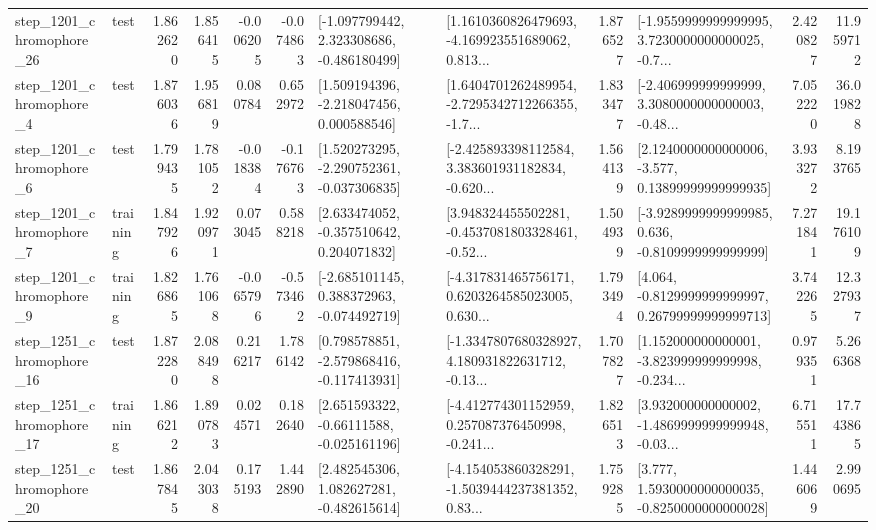 \begin{tabular}{llrrrrllrlrr}
 step\_1201\_chromophore\_26 &      test &      1.862620 &    1.856415 &     -0.006205 & -0.074863 &   [-1.097799442, 2.323308686, -0.486180499] &  [1.1610360826479693, -4.169923551689062, 0.813... &       1.876527 &  [-1.9559999999999995, 3.7230000000000025, -0.7... &            2.420827 &         11.959712 \\
  step\_1201\_chromophore\_4 &      test &      1.876036 &    1.956819 &      0.080784 &  0.652972 &    [1.509194396, -2.218047456, 0.000588546] &  [1.6404701262489954, -2.7295342712266355, -1.7... &       1.833477 &  [-2.406999999999999, 3.3080000000000003, -0.48... &            7.052220 &         36.019828 \\
  step\_1201\_chromophore\_6 &      test &      1.799435 &    1.781052 &     -0.018384 & -0.176763 &   [1.520273295, -2.290752361, -0.037306835] &  [-2.425893398112584, 3.383601931182834, -0.620... &       1.564139 &  [2.1240000000000006, -3.577, 0.13899999999999935] &            3.933272 &          8.193765 \\
  step\_1201\_chromophore\_7 &  training &      1.847926 &    1.920971 &      0.073045 &  0.588218 &    [2.633474052, -0.357510642, 0.204071832] &  [3.948324455502281, -0.4537081803328461, -0.52... &       1.504939 &  [-3.9289999999999985, 0.636, -0.8109999999999999] &            7.271841 &         19.176109 \\
  step\_1201\_chromophore\_9 &  training &      1.826865 &    1.761068 &     -0.065796 & -0.573462 &   [-2.685101145, 0.388372963, -0.074492719] &  [-4.317831465756171, 0.6203264585023005, 0.630... &       1.793494 &  [4.064, -0.8129999999999997, 0.26799999999999713] &            3.742265 &         12.327937 \\
 step\_1251\_chromophore\_16 &      test &      1.872280 &    2.088498 &      0.216217 &  1.786142 &   [0.798578851, -2.579868416, -0.117413931] &  [-1.3347807680328927, 4.180931822631712, -0.13... &       1.707827 &  [1.152000000000001, -3.823999999999998, -0.234... &            0.979351 &          5.266368 \\
 step\_1251\_chromophore\_17 &  training &      1.866212 &    1.890783 &      0.024571 &  0.182640 &    [2.651593322, -0.66111588, -0.025161196] &  [-4.412774301152959, 0.257087376450998, -0.241... &       1.826513 &  [3.932000000000002, -1.4869999999999948, -0.03... &            6.715511 &         17.743865 \\
 step\_1251\_chromophore\_20 &      test &      1.867845 &    2.043038 &      0.175193 &  1.442890 &    [2.482545306, 1.082627281, -0.482615614] &  [-4.154053860328291, -1.5039444237381352, 0.83... &       1.759285 &   [3.777, 1.5930000000000035, -0.8250000000000028] &            1.446069 &          2.990695 \\

\end{tabular}
